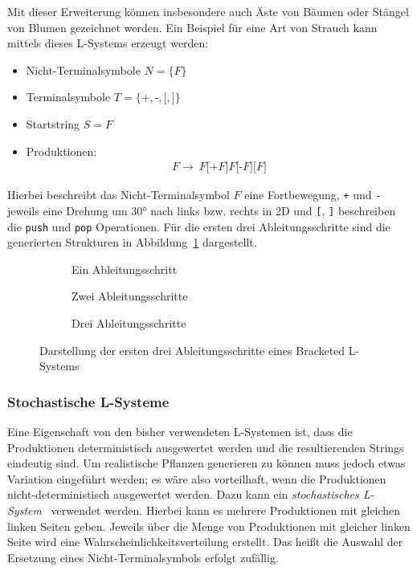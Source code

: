 Mit dieser Erweiterung können insbesondere auch Äste von Bäumen oder Stängel von Blumen gezeichnet werden.
Ein Beispiel für eine Art von Strauch kann mittels dieses L-Systems erzeugt werden:
\begin{itemize}
    \item Nicht-Terminalsymbole $N=\{F\}$
    \item Terminalsymbole $T=\{\texttt{+},\texttt{-},\texttt{[},\texttt{]}\}$
    \item Startstring $S=F$
    \item Produktionen:
    \begin{align*}
        F\rightarrow~F\texttt{[+}F\texttt{]}F\texttt{[-}F\texttt{]}\texttt{[}F\texttt{]}
    \end{align*}
\end{itemize}

Hierbei beschreibt das Nicht-Terminalsymbol $F$ eine Fortbewegung, \texttt{+} und \texttt{-} jeweils eine Drehung um \ang{30} nach links bzw. rechts in 2D und \texttt{[}, \texttt{]} beschreiben die \texttt{push} und \texttt{pop} Operationen.
Für die ersten drei Ableitungsschritte sind die generierten Strukturen in Abbildung~\ref{fig:Bracketed} dargestellt.

\begin{figure}[ht]
   \begin{subfigure}[t]{.3\textwidth}
       \centering
       
       \caption*{Ein Ableitungsschritt}
   \end{subfigure}
   \hfill
   \begin{subfigure}[t]{.3\textwidth}
       \centering
       
       \caption*{Zwei Ableitungsschritte}
   \end{subfigure}
   \hfill
   \begin{subfigure}[t]{.3\textwidth}
       \centering
       
       \caption*{Drei Ableitungsschritte}
   \end{subfigure}
   \caption{Darstellung der ersten drei Ableitungsschritte eines Bracketed L-Systems}\label{fig:Bracketed}
\end{figure}


\subsubsection{Stochastische L-Systeme}
Eine Eigenschaft von den bisher verwendeten L-Systemen ist, dass die Produktionen deterministisch ausgewertet werden und die resultierenden Strings eindeutig sind.
Um realistische Pflanzen generieren zu können muss jedoch etwas Variation eingeführt werden; es wäre also vorteilhaft, wenn die Produktionen nicht-deterministisch ausgewertet werden.
Dazu kann ein \emph{stochastisches L-System}~\cite*{Shaker2016} verwendet werden.
Hierbei kann es mehrere Produktionen mit gleichen linken Seiten geben.
Jeweils über die Menge von Produktionen mit gleicher linken Seite wird eine Wahrscheinlichkeitsverteilung erstellt.
Das heißt die Auswahl der Ersetzung eines Nicht-Terminalsymbols erfolgt zufällig.

